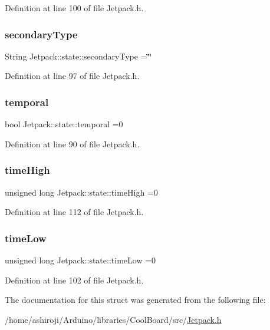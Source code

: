 Definition at line 100 of file Jetpack.\+h.

\mbox{\label{struct_jetpack_1_1state_a81cf9af139da095b7d91e2a87e50135b}} 
\subsubsection{\texorpdfstring{secondary\+Type}{secondaryType}}
{\footnotesize\ttfamily String Jetpack\+::state\+::secondary\+Type =\char`\"{}\char`\"{}}



Definition at line 97 of file Jetpack.\+h.

\mbox{\label{struct_jetpack_1_1state_abd6039e7a48856550b0ffbf8bcff7bdd}} 
\subsubsection{\texorpdfstring{temporal}{temporal}}
{\footnotesize\ttfamily bool Jetpack\+::state\+::temporal =0}



Definition at line 90 of file Jetpack.\+h.

\mbox{\label{struct_jetpack_1_1state_a97c594b20b03b46ae0a6ac544f5d6c8d}} 
\subsubsection{\texorpdfstring{time\+High}{timeHigh}}
{\footnotesize\ttfamily unsigned long Jetpack\+::state\+::time\+High =0}



Definition at line 112 of file Jetpack.\+h.

\mbox{\label{struct_jetpack_1_1state_ae544475d627308218e355a8dbb28ac74}} 
\subsubsection{\texorpdfstring{time\+Low}{timeLow}}
{\footnotesize\ttfamily unsigned long Jetpack\+::state\+::time\+Low =0}



Definition at line 102 of file Jetpack.\+h.



The documentation for this struct was generated from the following file\+:\begin{DoxyCompactItemize}
\item 
/home/ashiroji/\+Arduino/libraries/\+Cool\+Board/src/\hyperlink{_jetpack_8h}{Jetpack.\+h}\end{DoxyCompactItemize}
